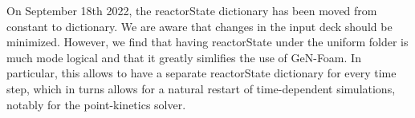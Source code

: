 
\begin{DoxyItemize}
\item On September 18th 2022, the reactor\+State dictionary has been moved from constant to dictionary. We are aware that changes in the input deck should be minimized. However, we find that having reactor\+State under the uniform folder is much mode logical and that it greatly simlifies the use of Ge\+N-\/\+Foam. In particular, this allows to have a separate reactor\+State dictionary for every time step, which in turns allows for a natural restart of time-\/dependent simulations, notably for the point-\/kinetics solver. 
\end{DoxyItemize}
